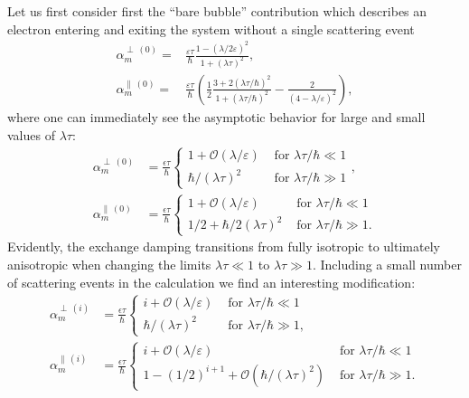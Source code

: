 Let us first consider first the ``bare bubble'' contribution which describes an electron entering and exiting the system without a single scattering event
\begin{align}
    \alpha_{m}^{\perp\,(0)} =  & \frac{\varepsilon\tau}{\hbar} \frac{1-(\lambda/2\varepsilon)^2}{1+(\lambda\tau)^2},\\
    \alpha_{m}^{\parallel\,(0)} =  & \frac{\varepsilon\tau}{\hbar}\left(\frac{1}{2}\frac{3+2(\lambda\tau/\hbar)^2}{1+(\lambda\tau/\hbar)^2}-\frac{2}{(4-\lambda/\varepsilon)^2}\right),
\end{align}
where one can immediately see the asymptotic behavior for large and small values of $\lambda\tau$:
\begin{align}
    \alpha_{m}^{\perp\,(0)}  & = \frac{\epsilon\tau}{\hbar}\begin{cases}
    1  +\mathcal{O}(\lambda/\varepsilon)  & \text{ for }\lambda\tau/\hbar\ll1\\
    \hbar/(\lambda\tau)^2 & \text{ for }\lambda\tau/\hbar\gg1
    \end{cases},\\
    \alpha_{m}^{\parallel\,(0)}  & = \frac{\epsilon\tau}{\hbar}\begin{cases}
    1  +\mathcal{O}(\lambda/\varepsilon)  & \text{ for }\lambda\tau/\hbar\ll1\\
    1/2 + \hbar/2(\lambda\tau)^2 & \text{ for }\lambda\tau/\hbar\gg1.
    \end{cases}
\end{align}
Evidently, the exchange damping transitions from fully isotropic to ultimately anisotropic when changing the limits $\lambda\tau\ll1$ to $\lambda\tau\gg1$. 
Including a small number of scattering events in the calculation we find an interesting modification:
\begin{align}
	\label{eq:perpi}
    \alpha_{m}^{\perp\,(i)}  & = \frac{\epsilon\tau}{\hbar}\begin{cases}
    i + \mathcal{O}(\lambda/\varepsilon)  & \text{ for }\lambda\tau/\hbar\ll1\\
    \hbar/(\lambda\tau)^2 & \text{ for }\lambda\tau/\hbar\gg1,
    \end{cases}\\
    \label{eq:parai}
    \alpha_{m}^{\parallel\,(i)}  &  = \frac{\epsilon\tau}{\hbar}\begin{cases}
    i + \mathcal{O}(\lambda/\varepsilon)  & \text{ for }\lambda\tau/\hbar\ll1\\
    1-(1/2)^{i+1}+\mathcal{O}(\hbar/(\lambda\tau)^2) & \text{ for }\lambda\tau/\hbar\gg1.
    \end{cases}
\end{align}
